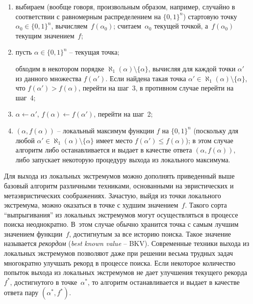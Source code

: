 \begin{enumerate}
\item
  выбираем (вообще говоря, произвольным образом, например, случайно в соответствии с равномерным распределением на $\{ 0,1 \}^{n}$) стартовую точку~$\alpha_{0} \in \{ 0,1 \}^{n}$, вычисляем~$f(\alpha_{0})$; считаем~$\alpha_{0}$ текущей точкой, а~$f(\alpha_{0})$ текущим значением~$f$;

\item
  пусть $\alpha \in \{ 0,1 \}^{n}$ \--- текущая точка;

  обходим в некотором порядке $\aleph_{1}(\alpha) \setminus \{ \alpha \}$, вычисляя для каждой точки $\alpha'$ из данного множества $f(\alpha')$. Если найдена такая точка $\alpha' \in \aleph_{1}(\alpha) \setminus \{ \alpha \}$, что $f(\alpha') > f(\alpha)$, перейти на шаг~3, в противном случае перейти на шаг~4;

\item
  $\alpha \gets \alpha'$, $f(\alpha) \gets f(\alpha')$, перейти на шаг~2;

\item
  $(\alpha,f(\alpha))$ \--- локальный максимум функции $f$ на $\{ 0,1 \}^{n}$ (поскольку для любой $\alpha' \in \aleph_{1}(\alpha) \setminus \{\alpha\}$ имеет место $f(\alpha') \leq f(\alpha)$); в этом случае алгоритм либо останавливается и выдает в качестве ответа $(\alpha, f(\alpha))$, либо запускает некоторую процедуру выхода из локального максимума.
\end{enumerate}

Для выхода из локальных экстремумов можно дополнять приведенный выше базовый алгоритм различными техниками, основанными на эвристических и метаэвристических соображениях.
Зачастую, выйдя из точки локального экстремума, можно оказаться в точке с худшим значением~$f$.
Такого сорта \enquote{выпрыгивания} из локальных экстремумов могут осуществляться в процессе поиска неоднократно.
В~этом случае обычно хранится точка с самым лучшим значением функции~$f$, достигнутым за все историю поиска.
Такое значение называется \textit{рекордом} (\textit{best known value} \--- BKV).
Современные техники выхода из локальных экстремумов позволяют даже при решении весьма трудных задач многократно улучшать рекорд в процессе поиска.
Если некоторое количество попыток выхода из локальных экстремумов не дает улучшения текущего рекорда~$f^{*}$, достигнутого в точке~$\alpha^{*}$, то алгоритм останавливается и выдает в качестве ответа пару $(\alpha^{*}, f^{*})$.

